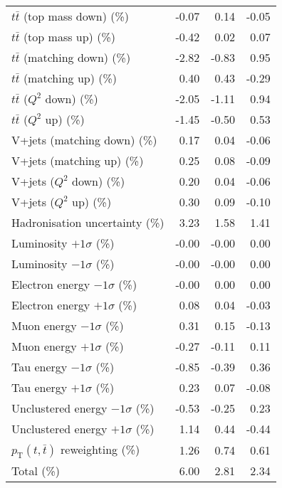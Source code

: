 \begin{table}[htbp]
{\begin{tabular}{lrrr}
$t\bar{t}$ (top mass down) (\%) & -0.07 & 0.14 & -0.05 \\ 
$t\bar{t}$ (top mass up) (\%) & -0.42 & 0.02 & 0.07 \\ 
$t\bar{t}$ (matching down) (\%) & -2.82 & -0.83 & 0.95 \\ 
$t\bar{t}$ (matching up) (\%) & 0.40 & 0.43 & -0.29 \\ 
$t\bar{t}$ ($Q^{2}$ down) (\%) & -2.05 & -1.11 & 0.94 \\ 
$t\bar{t}$ ($Q^{2}$ up) (\%) & -1.45 & -0.50 & 0.53 \\ 
V+jets (matching down) (\%) & 0.17 & 0.04 & -0.06 \\ 
V+jets (matching up) (\%) & 0.25 & 0.08 & -0.09 \\ 
V+jets ($Q^{2}$ down) (\%) & 0.20 & 0.04 & -0.06 \\ 
V+jets ($Q^{2}$ up) (\%) & 0.30 & 0.09 & -0.10 \\ 
Hadronisation uncertainty (\%) & 3.23 & 1.58 & 1.41 \\ 
Luminosity $+1\sigma$ (\%) & -0.00 & -0.00 & 0.00 \\ 
Luminosity $-1\sigma$ (\%) & -0.00 & -0.00 & 0.00 \\ 
Electron energy $-1\sigma$ (\%) & -0.00 & 0.00 & 0.00 \\ 
Electron energy $+1\sigma$ (\%) & 0.08 & 0.04 & -0.03 \\ 
Muon energy $-1\sigma$ (\%) & 0.31 & 0.15 & -0.13 \\ 
Muon energy $+1\sigma$ (\%) & -0.27 & -0.11 & 0.11 \\ 
Tau energy $-1\sigma$ (\%) & -0.85 & -0.39 & 0.36 \\ 
Tau energy $+1\sigma$ (\%) & 0.23 & 0.07 & -0.08 \\ 
Unclustered energy $-1\sigma$ (\%) & -0.53 & -0.25 & 0.23 \\ 
Unclustered energy $+1\sigma$ (\%) & 1.14 & 0.44 & -0.44 \\ 
$p_\mathrm{T}(t,\bar{t})$ reweighting (\%) & 1.26 & 0.74 & 0.61 \\ 
\hline 
Total (\%) & 6.00  & 2.81  & 2.34 \\ 
\hline 
\end{tabular}
}
\end{table}
